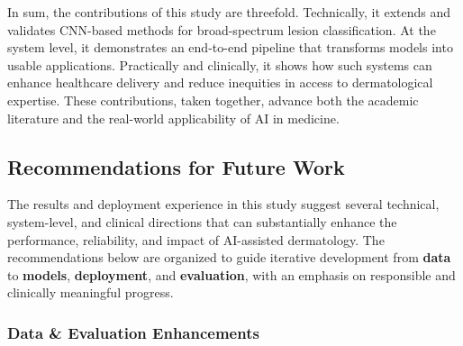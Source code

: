 \documentclass[
  12pt,
  oneside]{article}
\begin{document}
In sum, the contributions of this study are threefold. Technically, it
extends and validates CNN-based methods for broad-spectrum lesion
classification. At the system level, it demonstrates an end-to-end
pipeline that transforms models into usable applications. Practically
and clinically, it shows how such systems can enhance healthcare
delivery and reduce inequities in access to dermatological expertise.
These contributions, taken together, advance both the academic
literature and the real-world applicability of AI in medicine.

\subsection{Recommendations for Future
Work}\label{recommendations-for-future-work}

The results and deployment experience in this study suggest several
technical, system-level, and clinical directions that can substantially
enhance the performance, reliability, and impact of AI-assisted
dermatology. The recommendations below are organized to guide iterative
development from \textbf{data} to \textbf{models}, \textbf{deployment},
and \textbf{evaluation}, with an emphasis on responsible and clinically
meaningful progress.

\subsubsection{Data \& Evaluation
Enhancements}\label{data-evaluation-enhancements}
\end{document}

